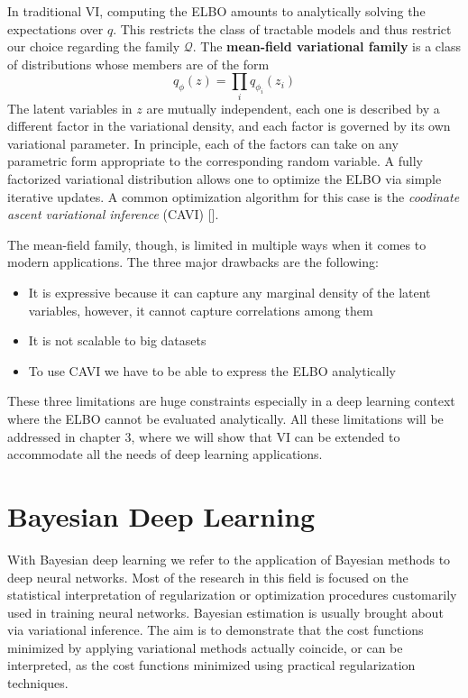 In traditional VI, computing the ELBO amounts to analytically solving the expectations over $q$. This restricts the class of tractable models and thus restrict our choice regarding the family $\mathcal{Q}$. The \textbf{mean-field variational family} is a class of distributions whose members are of the form
$$q_\phi(z) = \prod_i q_{\phi_i}(z_i)$$
The latent variables in $z$ are mutually independent, each one is described by a different factor in the variational density, and each factor is governed by its own variational parameter. In principle, each of the factors can take on any parametric form appropriate to the corresponding random variable. A fully factorized variational distribution allows one to optimize the ELBO via simple iterative updates. A common optimization algorithm for this case is the \textit{coodinate ascent variational inference} (CAVI) [\cite{VIstat2016}].

The mean-field family, though, is limited in multiple ways when it comes to modern applications. The three major drawbacks are the following:
\begin{itemize}
    \item It is expressive because it can capture any marginal density of the latent variables, however, it cannot capture correlations among them
    \item It is not scalable to big datasets
    \item To use CAVI we have to be able to express the ELBO analytically
\end{itemize}
These three limitations are huge constraints especially in a deep learning context where the ELBO cannot be evaluated analytically. All these limitations will be addressed in chapter 3, where we will show that VI can be extended to accommodate all the needs of deep learning applications. 






\section{Bayesian Deep Learning}
With Bayesian deep learning we refer to the application of Bayesian methods to deep neural networks. Most of the research in this field is focused on the statistical interpretation of regularization or optimization procedures customarily used in training neural networks. Bayesian estimation is usually brought about via variational inference. The aim is to demonstrate that the cost functions minimized by applying variational methods actually coincide, or can be interpreted, as the cost functions minimized using practical regularization techniques.

